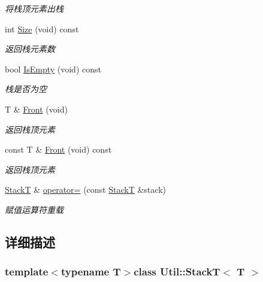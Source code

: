 \begin{DoxyCompactItemize}
\begin{DoxyCompactList}\small\item\em 将栈顶元素出栈 \end{DoxyCompactList}\item 
int \hyperlink{class_util_1_1_stack_t_a6f4a2b4e2664e9a771e989a31dbfa27d}{Size} (void) const 
\begin{DoxyCompactList}\small\item\em 返回栈元素数 \end{DoxyCompactList}\item 
bool \hyperlink{class_util_1_1_stack_t_a1a6fa3d62c05f1bf24b21924a6f692f0}{Is\-Empty} (void) const 
\begin{DoxyCompactList}\small\item\em 栈是否为空 \end{DoxyCompactList}\item 
T \& \hyperlink{class_util_1_1_stack_t_aab6508f39b4c9e364c492955b26273be}{Front} (void)
\begin{DoxyCompactList}\small\item\em 返回栈顶元素 \end{DoxyCompactList}\item 
const T \& \hyperlink{class_util_1_1_stack_t_ac298ea33edc7cd88fc9f640e39c8d9c7}{Front} (void) const 
\begin{DoxyCompactList}\small\item\em 返回栈顶元素 \end{DoxyCompactList}\item 
\hypertarget{class_util_1_1_stack_t_af093ce3aaa86e1807ed34e118c785cf9}{\hyperlink{class_util_1_1_stack_t}{Stack\-T} \& \hyperlink{class_util_1_1_stack_t_af093ce3aaa86e1807ed34e118c785cf9}{operator=} (const \hyperlink{class_util_1_1_stack_t}{Stack\-T} \&stack)}\label{class_util_1_1_stack_t_af093ce3aaa86e1807ed34e118c785cf9}

\begin{DoxyCompactList}\small\item\em 赋值运算符重载 \end{DoxyCompactList}\end{DoxyCompactItemize}


\subsection{详细描述}
\subsubsection*{template$<$typename T$>$class Util\-::\-Stack\-T$<$ T $>$}



